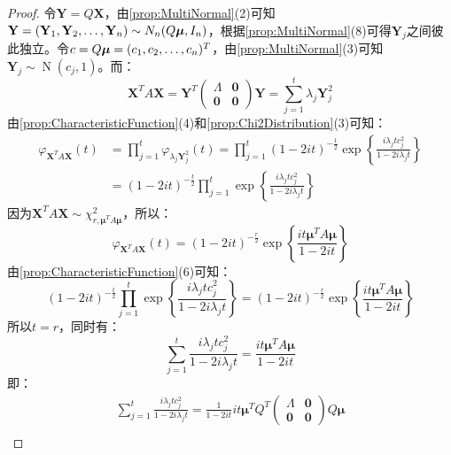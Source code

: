 \begin{proof}
	令$\mathbf{Y}=Q\mathbf{X}$，由\cref{prop:MultiNormal}(2)可知$\mathbf{Y}=(\mathbf{Y}_1, \mathbf{Y}_2, \dots, \mathbf{Y}_{n})\sim N_n(Q\boldsymbol{\mu},I_n)$，根据\cref{prop:MultiNormal}(8)可得$\mathbf{Y}_j$之间彼此独立。令$c=Q\boldsymbol{\mu}=(c_1, c_2, \dots, c_{n})^T$，由\cref{prop:MultiNormal}(3)可知$\mathbf{Y}_j\sim \operatorname{N}(c_j,1)$。而：
	\begin{equation*}
		\mathbf{X}^TA\mathbf{X}=\mathbf{Y}^T
		\begin{pmatrix}
			\varLambda & \mathbf{0} \\
			\mathbf{0} & \mathbf{0}
		\end{pmatrix}\mathbf{Y}=\sum_{j=1}^{t}\lambda_j\mathbf{Y}_j^2
	\end{equation*}
	由\cref{prop:CharacteristicFunction}(4)和\cref{prop:Chi2Distribution}(3)可知：
	\begin{align*}
		\varphi_{\mathbf{X}^TA\mathbf{X}}(t)
		&=\prod_{j=1}^{t}\varphi_{\lambda_j\mathbf{Y}_j^2}(t)=\prod_{j=1}^t(1-2it)^{-\frac{1}{2}}\exp\left\{\frac{i\lambda_jtc_j^2}{1-2i\lambda_jt}\right\} \\
		&=(1-2it)^{-\frac{t}{2}}\prod_{j=1}^t\exp\left\{\frac{i\lambda_jtc_j^2}{1-2i\lambda_jt}\right\}
	\end{align*}
	因为$\mathbf{X}^TA\mathbf{X}\sim\chi_{r,\boldsymbol{\mu}^TA\boldsymbol{\mu}}^2$，所以：
	\begin{equation*}
		\varphi_{\mathbf{X}^TA\mathbf{X}}(t)=(1-2it)^{-\frac{r}{2}}\exp\left\{\frac{it\boldsymbol{\mu}^TA\boldsymbol{\mu}}{1-2it}\right\}
	\end{equation*}
	由\cref{prop:CharacteristicFunction}(6)可知：
	\begin{equation*}
		(1-2it)^{-\frac{t}{2}}\prod_{j=1}^t\exp\left\{\frac{i\lambda_jtc_j^2}{1-2i\lambda_jt}\right\}=(1-2it)^{-\frac{r}{2}}\exp\left\{\frac{it\boldsymbol{\mu}^TA\boldsymbol{\mu}}{1-2it}\right\}
	\end{equation*}
	所以$t=r$，同时有：
	\begin{equation*}
		\sum_{j=1}^{t}\frac{i\lambda_jtc_j^2}{1-2i\lambda_jt}=\frac{it\boldsymbol{\mu}^TA\boldsymbol{\mu}}{1-2it}
	\end{equation*}
	即：
	\begin{gather*}
		\sum_{j=1}^{t}\frac{i\lambda_jtc_j^2}{1-2i\lambda_jt}=\frac{1}{1-2it}it\boldsymbol{\mu}^TQ^T
		\begin{pmatrix}
			\varLambda & \mathbf{0} \\
			\mathbf{0} & \mathbf{0}
		\end{pmatrix}
		Q\boldsymbol{\mu} \\

\end{gather*}
\end{proof}
